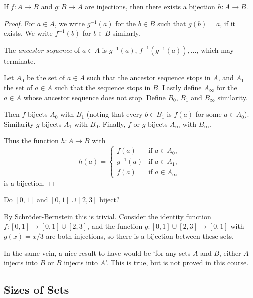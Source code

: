 \documentclass[a4paper]{scrartcl}
\begin{document}
\begin{theorem}
	If $f : A \rightarrow B$ and $g : B \rightarrow A$ are injections, then there exists a bijection $h : A \rightarrow B$.
\end{theorem}
\begin{proof}
	For $a \in A$, we write $g^{-1}(a)$ for the $b \in B$ such that $g(b) = a$, if it exists. We write $f^{-1}(b)$ for $b \in B$ similarly. 

	The \emph{ancestor sequence} of $a \in A$ is $g^{-1}(a)$, $f^{-1}(g^{-1}(a)), \dots$, which may terminate.

	Let $A_0$ be the set of $a \in A$ such that the ancestor sequence stops in $A$, and $A_1$ the set of $a \in A$ such that the sequence stops in $B$. Lastly define $A_\infty$ for the $a \in A$ whose ancestor sequence does not stop. Define $B_0$, $B_1$ and $B_\infty$ similarity.

	Then $f$ bijects $A_0$ with $B_1$ (noting that every $b \in B_1$ is $f(a)$ for some $a \in A_0$). Similarity $g$ bijects $A_1$ with $B_0$. Finally, $f$ or $g$ bijects $A_\infty$ with $B_\infty$.

	Thus the function $h: A \rightarrow B$ with
	$$
	h(a) = \begin{cases}
		f(a) &\mbox{if } a \in A_0, \\
		g^{-1}(a) &\mbox{if } a \in A_1, \\
		f(a) &\mbox{if } a \in A_\infty
	   \end{cases}
	$$
	is a bijection.
\end{proof}

\begin{example}
	Do $[0, 1]$ and $[0, 1] \cup [2, 3]$ biject?

	By Schröder-Bernstein this is trivial. Consider the identity function $f: [0, 1] \rightarrow [0, 1] \cup [2, 3]$, and the function $g : [0, 1] \cup [2, 3] \rightarrow [0, 1]$ with $g(x) = x/3$ are both injections, so there is a bijection between these sets.
\end{example}

In the same vein, a nice result to have would be `for any sets $A$ and $B$, either $A$ injects into $B$ or $B$ injects into $A$'. This is true, but is not proved in this course.


\subsection{Sizes of Sets}
\end{document}
